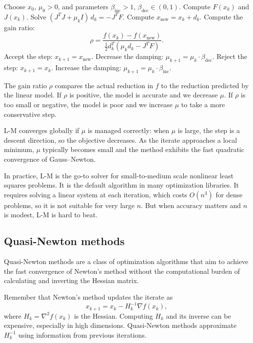 \documentclass[lang=en,color=blue,mode=fancy,titlestyle=hang]{elegantbook}
\begin{document}
\begin{algorithm}[H]
\caption{Levenberg–Marquardt Method}
\begin{algorithmic}
\State Choose $x_0$, $\mu_0 > 0$, and parameters $\beta_{\text{inc}} > 1$, $\beta_{\text{dec}} \in (0, 1)$.
  \State Compute $F(x_k)$ and $J(x_k)$.
  \State Solve $(J^T J + \mu_k I) \, d_k = -J^T F$.
  \State Compute $x_{\text{new}} = x_k + d_k$.
  \State Compute the gain ratio:
  \[
  \rho = \frac{f(x_k) - f(x_{\text{new}})}{\frac12 d_k^T (\mu_k d_k - J^T F)}.
  \]
    \State Accept the step: $x_{k+1} = x_{\text{new}}$.
    \State Decrease the damping: $\mu_{k+1} = \mu_k \cdot \beta_{\text{dec}}$.
  \Else
    \State Reject the step: $x_{k+1} = x_k$.
    \State Increase the damping: $\mu_{k+1} = \mu_k \cdot \beta_{\text{inc}}$.
  \EndIf
\EndFor
\end{algorithmic}
\end{algorithm}

The gain ratio $\rho$ compares the actual reduction in $f$ to the reduction predicted by the linear
model. If $\rho$ is positive, the model is accurate and we decrease $\mu$. If $\rho$ is too small
or negative, the model is poor and we increase $\mu$ to take a more conservative step.

L-M converges globally if $\mu$ is managed correctly: when $\mu$ is large, the step is a descent
direction, so the objective decreases. As the iterate approaches a local minimum, $\mu$ typically
becomes small and the method exhibits the fast quadratic convergence of Gauss–Newton.

In practice, L-M is the go-to solver for small-to-medium scale nonlinear least squares problems.
It is the default algorithm in many optimization libraries. It requires solving a linear system
at each iteration, which costs $O(n^3)$ for dense problems, so it is not suitable for very large
$n$. But when accuracy matters and $n$ is modest, L-M is hard to beat.

\subsection{Quasi-Newton methods}
Quasi-Newton methods are a class of optimization algorithms that aim to achieve the fast convergence
of Newton's method without the computational burden of calculating and inverting the Hessian matrix.

Remember that Newton's method updates the iterate as
\[
x_{k+1} = x_k - H_k^{-1} \nabla f(x_k),
\]
where $H_k = \nabla^2 f(x_k)$ is the Hessian. Computing $H_k$ and its inverse can be expensive,
especially in high dimensions. Quasi-Newton methods approximate $H_k^{-1}$ using information from
previous iterations.
\end{document}
